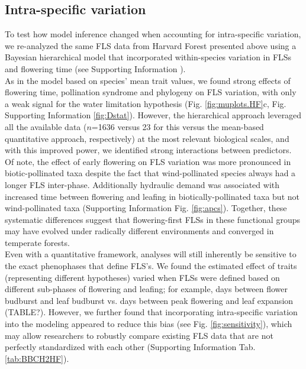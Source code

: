 \documentclass[11pt]{article}
\begin{document}
\subsection*{Intra-specific variation}
\noindent To test how model inference changed when accounting for intra-specific variation, we re-analyzed the same FLS data from Harvard Forest presented above using a Bayesian hierarchical model that incorporated within-species variation in FLSs and flowering time (see Supporting Information ).\\

\noindent As in the model based on species' mean trait values, we found strong effects of flowering time, pollination syndrome and phylogeny on FLS variation, with only a weak signal for the water limitation  hypothesis (Fig. \ref{fig:muplots.HF}c, Fig. Supporting Information \ref{fig:Dstat}). However, the hierarchical approach leveraged all the available data ($n$=1636 versus 23 for this versus the mean-based quantitative approach, respectively) at the most relevant biological scales, and with this improved power, we identified strong interactions between predictors. Of note, the effect of early flowering on FLS variation was more pronounced in biotic-pollinated taxa despite the fact that wind-pollinated species always had a longer FLS inter-phase. Additionally hydraulic demand  was associated with increased time between flowering and leafing in biotically-pollinated taxa but not wind-pollinated taxa (Supporting Information Fig. \ref{fig:apcs}). Together, these systematic differences suggest that flowering-first FLSs in these functional groups may have evolved under radically different environments and converged in temperate forests.\\%

\noindent Even with a quantitative framework, analyses will still inherently be sensitive to the exact phenophases that define FLS's. We found the estimated effect of traits (representing different hypotheses) varied when FLSs were defined based on different sub-phases of flowering and leafing; for example, days between flower budburst and leaf budburst vs. days between peak flowering and leaf expansion (TABLE?). However, we further found that incorporating intra-specific variation into the modeling appeared to reduce this bias (see Fig. \ref{fig:sensitivity}), which may allow researchers to robustly compare existing FLS data  that are not perfectly standardized with each other (Supporting Information Tab. \ref{tab:BBCH2HF}).\\
\end{document}

